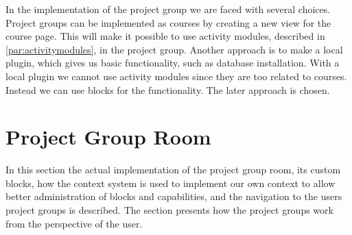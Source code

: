 In the implementation of the project group we are faced with several choices. 
Project groups can be implemented as courses by creating a new view for the course page.  
This will make it possible to use activity modules, described in \ref{par:activitymodules}, in the project group. 
Another approach is to make a local plugin, which gives us basic functionality, such as database installation. 
With a local plugin we cannot use activity modules since they are too related to courses. 
Instead we can use blocks for the functionality. 
The later approach is chosen. 

\section{Project Group Room}
In this section the actual implementation of the project group room, its custom blocks, how the context system is used to implement our own context to allow better administration of blocks and capabilities, and the navigation to the users project groups is described.
The section presents how the project groups work from the perspective of the user. 


